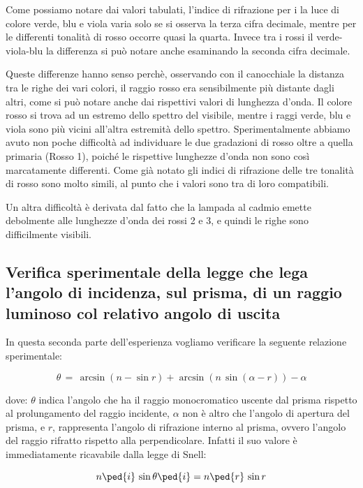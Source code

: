 Come possiamo notare dai valori tabulati, l'indice di rifrazione per i la luce di colore verde, blu e viola varia solo se si osserva la terza cifra decimale, mentre per le differenti tonalità di rosso occorre quasi la quarta. Invece tra i rossi il verde-viola-blu la differenza si può notare anche esaminando la seconda cifra decimale.

Queste differenze hanno senso perchè, osservando con il canocchiale la distanza tra le righe dei vari colori, il raggio rosso era sensibilmente più distante dagli altri, come si può notare anche dai rispettivi valori di lunghezza d'onda. Il colore rosso si trova ad un estremo dello spettro del visibile, mentre i raggi verde, blu e viola sono più vicini all'altra estremità dello spettro. Sperimentalmente abbiamo avuto non poche difficoltà ad individuare le due gradazioni di rosso oltre a quella primaria (Rosso 1), poiché le rispettive lunghezze d'onda non sono così marcatamente differenti. Come già notato gli indici di rifrazione delle tre tonalità di rosso sono molto simili, al punto che i valori sono tra di loro compatibili.

Un altra difficoltà è derivata dal fatto che la lampada al cadmio emette debolmente alle lunghezze d'onda dei rossi 2 e 3, e quindi le righe sono difficilmente visibili.

\subsection{Verifica sperimentale della legge che lega l'angolo di incidenza, sul prisma, di un raggio luminoso col relativo angolo di uscita}

In questa seconda parte dell'esperienza vogliamo verificare la seguente relazione sperimentale:

\begin{equation}
	\theta \,=\, \arcsin{(n - \sin{r})} + \arcsin{(n \, \sin{(\alpha - r)})} - \alpha
	\label{eq:brutta}
\end{equation}

dove: $\theta$ indica l'angolo che ha il raggio monocromatico uscente dal prisma rispetto al prolungamento del raggio incidente, $\alpha$ non è altro che l'angolo di apertura del prisma, e $r$, rappresenta l'angolo di rifrazione interno al prisma, ovvero l'angolo del raggio rifratto rispetto alla perpendicolare. Infatti il suo valore è immediatamente ricavabile dalla legge di Snell:

\begin{equation}
	 n\ped{i} \, \sin{\theta\ped{i}} = n\ped{r} \, \sin{r}
	 \label{snell}
\end{equation}

